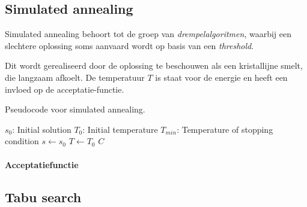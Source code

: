 \subsection{Simulated annealing}
Simulated annealing behoort tot de groep van \emph{drempelalgoritmen}, waarbij een slechtere oplossing soms aanvaard wordt op basis van een \emph{threshold}. 

Dit wordt gerealiseerd door de oplossing te beschouwen als een kristallijne smelt, die langzaam afkoelt. 
De temperatuur $T$ is staat voor de energie en heeft een invloed op de acceptatie-functie.

\begin{algorithm}
    \caption{Pseudocode voor simulated annealing.}
    \label{algo:kmeans}
    \begin{algorithmic} 
    \Require $s_0$: Initial solution
    \Require $T_0$: Initial temperature
    \Require $T_{min}$: Temperature of stopping condition
        \State $s \gets s_0$
        \State $T \gets T_0$
        \Repeat 
            \Repeat 
                \EndIf
         
         
         
        \State \Return $C$ 
    \EndFunction
    \end{algorithmic}
\end{algorithm}

\paragraph{Acceptatiefunctie}


\subsection{Tabu search}